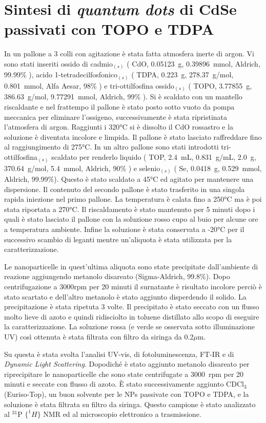 \section{Sintesi di \emph{quantum dots} di CdSe passivati con TOPO e TDPA}
In un pallone a 3 colli con agitazione è stata fatta atmosfera inerte di argon. Vi sono stati inseriti ossido di cadmio$_{(s)}$ ( CdO, 0.05123~g, 0.39896~mmol, Aldrich, 99.99\% ), acido 1-tetradecilfosfonico$_{(s)}$ ( TDPA, 0.223~g, 278.37~g/mol, 0.801~mmol, Alfa Aesar, 98\% ) e tri-ottilfosfina ossido$_{(s)}$ ( TOPO, 3.77855~g, 386.63~g/mol, 9.77291~mmol, Aldrich, 99\% ). Si è scaldato con un mantello riscaldante e nel frattempo il pallone è stato posto sotto vuoto da pompa meccanica per eliminare l'ossigeno, successivamente è stata ripristinata l'atmosfera di argon. Raggiunti i 320°C si è dissolto il CdO rossastro e la soluzione è diventata incolore e limpida. Il pallone è stato lasciato raffreddare fino al raggiungimento di 275°C. In un altro pallone sono stati introdotti tri-ottilfosfina$_{(s)}$ scaldato per renderlo liquido ( TOP, 2.4~mL, 0.831~g/mL, 2.0~g, 370.64~g/mol, 5.4~mmol, Aldrich, 90\% ) e selenio$_{(s)}$ ( Se, 0.0418~g, 0.529~mmol, Aldrich, 99.99\%). Questo è stato scaldato a 45°C ed agitato per mantenere una dispersione. Il contenuto del secondo pallone è stato trasferito in una singola rapida iniezione nel primo pallone. La temperatura è calata fino a 250°C ma è poi stata riportata a 270°C. Il riscaldamento è stato mantenuto per 5 minuti dopo i quali è stato lasciato il pallone con la soluzione rosso cupo al buio per alcune ore a temperatura ambiente. Infine la soluzione è stata conservata a -20°C per il successivo scambio di leganti mentre un'aliquota è stata utilizzata per la caratterizzazione.

Le nanoparticelle in quest'ultima aliquota sono state precipitate dall'ambiente di reazione aggiungendo metanolo disareato (Sigma-Aldrich, 99.8\%). Dopo centrifugazione a 3000rpm per 20 minuti il surnatante è risultato incolore perciò è stato scartato e dell'altro metanolo è stato aggiunto disperdendo il solido. La precipitazione è stata ripetuta 3 volte. Il precipitato è stato seccato con un flusso molto lieve di azoto e quindi ridisciolto in toluene distillato allo scopo di eseguire la caratterizzazione. La soluzione rossa (e verde se osservata sotto illuminazione UV) così ottenuta è stata filtrata con filtro da siringa da 0.2$\mu$m. 

Su questa è stata svolta l'analisi UV-vis, di fotoluminescenza, FT-IR e di \emph{Dynamic Light Scattering}. Dopodiché è stato aggiunto metanolo disareato per riprecipitare le nanoparticelle che sono state centrifugate a 3000~rpm per 20 minuti e seccate con flusso di azoto. È stato successivamente aggiunto CDCl$_3$ (Euriso-Top), un buon solvente per le NPs passivate con TOPO e TDPA, e la soluzione è stata filtrata su filtro da siringa. Questo campione è stato analizzato 
al $^{31}$P $\{^1H\}$ NMR ed al microscopio elettronico a trasmissione. 

